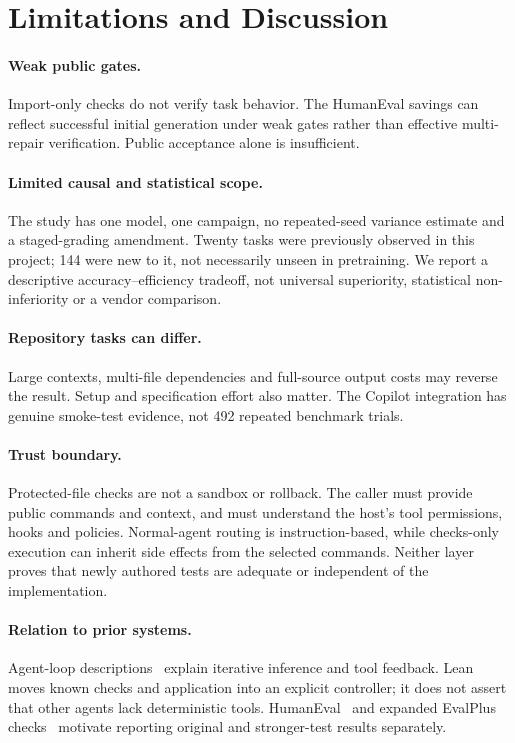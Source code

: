 \documentclass[10pt,twocolumn,a4paper]{article}
\begin{document}
\section{Limitations and Discussion}
\paragraph{Weak public gates.}
Import-only checks do not verify task behavior. The HumanEval savings can
reflect successful initial generation under weak gates rather than
effective multi-repair verification. Public acceptance alone is insufficient.

\paragraph{Limited causal and statistical scope.}
The study has one model, one campaign, no repeated-seed variance estimate and
a staged-grading amendment. Twenty tasks were previously observed in this
project; 144 were new to it, not necessarily unseen in pretraining.
We report a descriptive accuracy--efficiency tradeoff, not universal
superiority, statistical non-inferiority or a vendor comparison.

\paragraph{Repository tasks can differ.}
Large contexts, multi-file dependencies and full-source output costs may
reverse the result. Setup and specification effort also matter.
The Copilot integration has genuine smoke-test evidence, not 492 repeated
benchmark trials.

\paragraph{Trust boundary.}
Protected-file checks are not a sandbox or rollback. The caller must provide
public commands and context, and must understand the host's tool permissions,
hooks and policies.
Normal-agent routing is instruction-based, while checks-only execution can
inherit side effects from the selected commands. Neither layer proves that
newly authored tests are adequate or independent of the implementation.

\paragraph{Relation to prior systems.}
Agent-loop descriptions~\cite{codex,claude} explain iterative inference
and tool feedback. Lean moves known checks and application into an explicit
controller; it does not assert that other agents lack deterministic tools.
HumanEval~\cite{humaneval} and expanded EvalPlus checks~\cite{evalplus}
motivate reporting original and stronger-test results separately.
\end{document}
